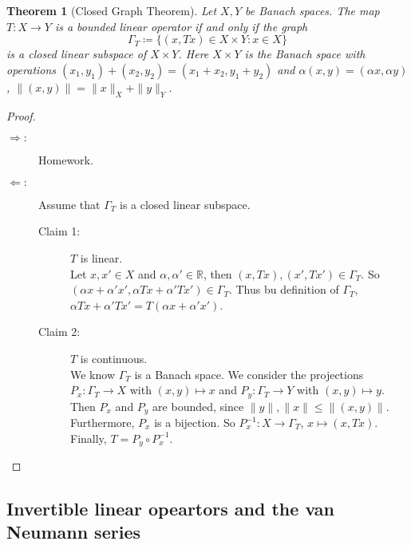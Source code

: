 \documentclass[12pt]{article}
\theoremstyle{plain}
\newtheorem{thm}{Theorem}
\theoremstyle{definition}
\begin{document}
\begin{thm}[Closed Graph Theorem]
    Let $X, Y$ be Banach spaces.
    The map $T:X\rightarrow Y$ is a bounded linear operator if and only if the graph
    \[
        \Gamma_T\coloneqq \{(x,Tx)\in X\times Y: x\in X\}
    \]
    is a closed linear subspace of $X\times Y$.
    Here $X\times Y$ is the Banach space with operations $(x_1,y_1) + (x_2, y_2) = (x_1+x_2, y_1+y_2)$ and 
    $\alpha(x,y) = (\alpha x, \alpha y)$, $\|(x,y)\| = \|x\|_X + \|y\|_Y$.
\end{thm}
\begin{proof}
    \begin{description}
        \item[$\Rightarrow: $]
            Homework.
        \item[$\Leftarrow: $]
            Assume that $\Gamma_T$ is a closed linear subspace.
            \begin{description}
                \item[Claim 1: ]$T$ is linear.\\
                    Let $x, x'\in X$ and $\alpha, \alpha'\in\mathbb{R}$, then
                    $(x, Tx), (x', Tx')\in \Gamma_T$.
                    So $(\alpha x + \alpha'x', \alpha Tx + \alpha'Tx')\in\Gamma_T$.
                    Thus bu definition of $\Gamma_T$, $\alpha Tx + \alpha' Tx' = T(\alpha x+\alpha'x')$.
                \item[Claim 2: ]$T$ is continuous.\\
                    We know $\Gamma_T$ is a Banach space.
                    We consider the projections $P_x:\Gamma_T\rightarrow X$ with $(x,y)\mapsto x$
                    and $P_y:\Gamma_T\rightarrow Y$ with $(x,y)\mapsto y$.
                    Then $P_x$ and $P_y$ are bounded, since $\|y\|, \|x\| \leq \|(x,y)\|$.
                    Furthermore, $P_x$ is a bijection.
                    So $P_x^{-1} : X\rightarrow \Gamma_T$,  $x\mapsto (x, Tx)$.
                    Finally, $T=P_y\circ P_x^{-1}$.
            \end{description}
    \end{description}
\end{proof}

\subsection*{Invertible linear opeartors and the van Neumann series}
\end{document}
